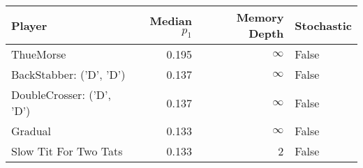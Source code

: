 \begin{tabular}{lrrl}
\toprule
                    Player &  Median $p_1$ &  Memory Depth & Stochastic \\
\midrule
                 ThueMorse &         0.195 &            \(\infty\) &      False \\
   BackStabber: ('D', 'D') &         0.137 &            \(\infty\) &      False \\
 DoubleCrosser: ('D', 'D') &         0.137 &            \(\infty\) &      False \\
                   Gradual &         0.133 &            \(\infty\) &      False \\
     Slow Tit For Two Tats &         0.133 &             2 &      False \\
\bottomrule
\end{tabular}
